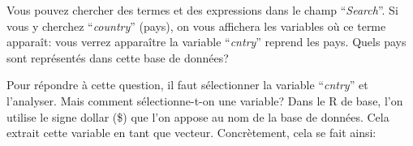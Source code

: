 \documentclass[
]{book}
\newenvironment{Shaded}{\begin{snugshade}}{\end{snugshade}}
\newcommand{\NormalTok}[1]{#1}
\newcommand{\SpecialCharTok}[1]{\textcolor[rgb]{0.00,0.00,0.00}{#1}}
\begin{document}
Vous pouvez chercher des termes et des expressions dans le champ ``\emph{Search}''. Si vous y cherchez ``\emph{country}'' (pays), on vous affichera les variables où ce terme apparaît: vous verrez apparaître la variable ``\emph{cntry}'' reprend les pays. Quels pays sont représentés dans cette base de données?

Pour répondre à cette question, il faut sélectionner la variable ``\emph{cntry}'' et l'analyser. Mais comment sélectionne-t-on une variable? Dans le R de base, l'on utilise le signe dollar (\$) que l'on appose au nom de la base de données. Cela extrait cette variable en tant que vecteur. Concrètement, cela se fait ainsi:

\begin{Shaded}
\end{Shaded}
\end{document}
